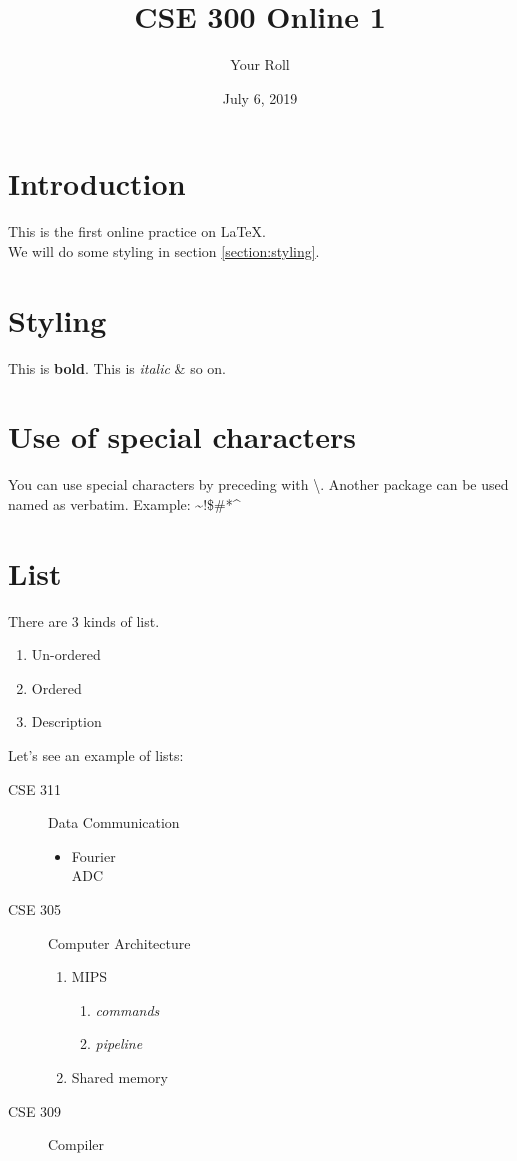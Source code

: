 \documentclass[18pt,a4paper]{article}
\author{Your Roll}
\title{CSE 300 Online 1}
\date{July 6, 2019}
\begin{document}
\maketitle
\tableofcontents
{}
\section{Introduction}
This is the first online practice on \LaTeX.\\
We will do some styling in section \ref{section:styling}.
\section{\label{section:styling} Styling}
This is {\color{red}\textbf{bold}}. 
This is {\color{green}\textit{italic}} \& so on.

\section*{Use of special characters}
You can use special characters by preceding with \textbackslash.
Another package can be used named as verbatim. 
Example: \textasciitilde!\$\#\textbackslash@*\textasciicircum

\section{List}
There are 3 kinds of list.
\begin{enumerate}[i]
	\item Un-ordered
	\item Ordered
	\item Description
\end{enumerate}
Let's see an example of lists:
\begin{description}
	\item[CSE 311] Data Communication 
	\begin{itemize}
		\item Fourier\\
		ADC
	\end{itemize}
	\item[CSE 305] Computer Architecture
	\begin{enumerate}
		\item MIPS
		
		\begin{enumerate}
			
			\item \textit{commands}
			\item \textit{pipeline}
			
		\end{enumerate}
		
		\item Shared memory
	\end{enumerate}
	\item[CSE 309] Compiler
\end{description}
\end{document}
